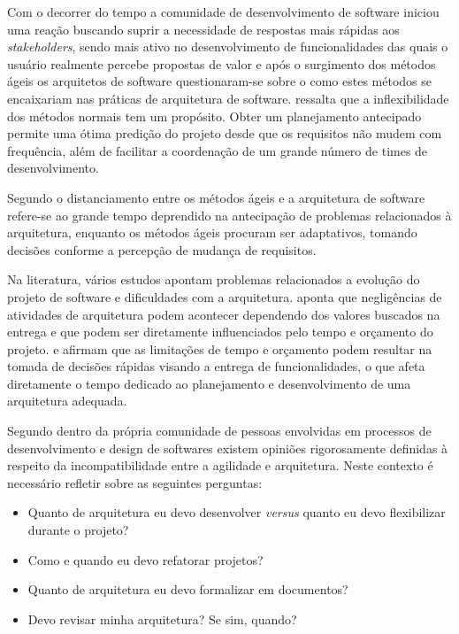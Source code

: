 Com o decorrer do tempo a comunidade de desenvolvimento de software iniciou uma reação buscando suprir a necessidade de respostas mais rápidas aos \textit{stakeholders}, sendo mais ativo no desenvolvimento de funcionalidades das quais o usuário realmente percebe propostas de valor e após o surgimento dos métodos ágeis os arquitetos de software questionaram-se sobre o como estes métodos se encaixariam nas práticas de arquitetura de software. \cite{babar2013agile} ressalta que a inflexibilidade dos métodos normais tem um propósito. Obter um planejamento antecipado permite uma ótima predição do projeto desde que os requisitos não mudem com frequência, além de facilitar a coordenação de um grande número de times de desenvolvimento.


Segundo \cite{abrahamsson2010agility} o distanciamento entre os métodos ágeis e a arquitetura de software refere-se ao grande tempo deprendido na antecipação de problemas relacionados à arquitetura, enquanto os métodos ágeis procuram ser adaptativos, tomando decisões conforme a percepção de mudança de requisitos. 

Na literatura, vários estudos apontam problemas relacionados a evolução do projeto de software e dificuldades com a arquitetura. \cite{waterman2015much} aponta que negligências de atividades de arquitetura podem acontecer dependendo dos valores buscados na entrega e que podem ser diretamente influenciados pelo tempo e orçamento do projeto. \cite{martini2015investigating} e \cite{bellomo2013study} afirmam que as limitações de tempo e orçamento podem resultar na tomada de decisões rápidas visando a entrega de funcionalidades, o que afeta diretamente o tempo dedicado ao planejamento e desenvolvimento de uma arquitetura adequada.

Segundo \cite{babar2013agile} dentro da própria comunidade de pessoas envolvidas em processos de desenvolvimento e design de softwares existem opiniões rigorosamente definidas à respeito da incompatibilidade entre a agilidade e arquitetura. Neste contexto é necessário refletir sobre as seguintes perguntas: 
\begin{itemize}
    \item Quanto de arquitetura eu devo desenvolver \textit{versus} quanto eu devo flexibilizar durante o projeto? 
    \item Como e quando eu devo refatorar projetos? 
    \item Quanto de arquitetura eu devo formalizar em documentos? 
    \item Devo revisar minha arquitetura? Se sim, quando?
\end{itemize}

